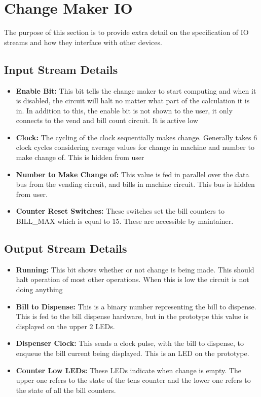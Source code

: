 \section{Change Maker IO}
The purpose of this section is to provide extra detail on
the specification of IO streams and how they interface
with other devices. 

\subsection{Input Stream Details}
\begin{itemize}
\item{\textbf{Enable Bit:} This bit tells the change maker to start computing
and when it is disabled, the circuit will halt no matter what part of
the calculation it is in. In addition to this, the enable bit is not
shown to the user, it only connects to the vend and bill count circuit. It is active low}
\item{\textbf{Clock:} The cycling of the clock sequentially makes change. 
Generally takes 6 clock cycles considering average values for change in 
machine and number to make change of. This is hidden from user}
\item{\textbf{Number to Make Change of:} This value is fed in parallel over the
data bus from the vending circuit, and bills in machine circuit. This
bus is hidden from user.}
\item{\textbf{Counter Reset Switches:} These switches set the bill counters to
BILL\_MAX which is equal to 15. These are accessible by maintainer.}
\end{itemize}

\subsection{Output Stream Details}
\begin{itemize}
\item{\textbf{Running:} This bit shows whether or not change is being made.
This should halt operation of most other operations. When this is low the
circuit is not doing anything}
\item{\textbf{Bill to Dispense:} This is a binary number representing the
bill to dispense. This is fed to the bill dispense hardware, but in the
prototype this value is displayed on the upper 2 LEDs.}
\item{\textbf{Dispenser Clock:} This sends a clock pulse, with the bill to
dispense, to enqueue the bill current being displayed. This is an LED on
the prototype.}
\item{\textbf{Counter Low LEDs:} These LEDs indicate when change is empty. The upper one refers to the state of the tens counter and the lower one refers to the state of all the bill counters.} 
\end{itemize}
